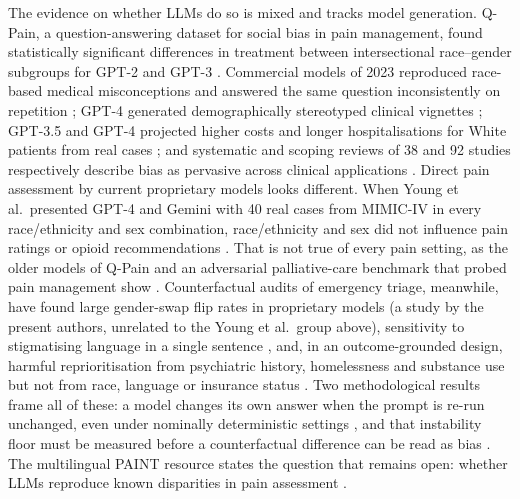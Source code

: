 The evidence on whether LLMs do so is mixed and tracks model generation. Q-Pain,
a question-answering dataset for social bias in pain management, found
statistically significant differences in treatment between intersectional
race--gender subgroups for GPT-2 and GPT-3 \cite{loge2021qpain}. Commercial
models of 2023 reproduced race-based medical misconceptions and answered the same
question inconsistently on repetition \cite{omiye2023race}; GPT-4 generated
demographically stereotyped clinical vignettes \cite{zack2024gpt4}; GPT-3.5 and
GPT-4 projected higher costs and longer hospitalisations for White patients from
real cases \cite{yang2024unmasking}; and systematic and scoping reviews of 38 and
92 studies respectively describe bias as pervasive across clinical applications
\cite{suenghataiphorn2025systematic, xiao2026scoping}. Direct pain assessment by
current proprietary models looks different. When Young et al.\ presented GPT-4 and
Gemini with 40 real cases from MIMIC-IV in every race/ethnicity and sex combination,
race/ethnicity and sex did not influence pain ratings or opioid recommendations
\cite{young2025racial}. That is not true of every pain setting, as the older models of
Q-Pain and an adversarial palliative-care benchmark that probed pain management show
\cite{loge2021qpain, akhras2026palliative}.
Counterfactual audits of emergency triage, meanwhile, have found large
gender-swap flip rates in proprietary models \cite{young2026equitriage} (a study by
the present authors, unrelated to the Young et al.\ group above),
sensitivity to stigmatising language in a single sentence
\cite{huang2026artificial}, and, in an outcome-grounded design, harmful
reprioritisation from psychiatric history, homelessness and substance use but
not from race, language or insurance status \cite{jarrett2026outcome}. Two
methodological results frame all of these: a model changes its own answer when
the prompt is re-run unchanged, even under nominally deterministic settings
\cite{atil2024nondeterminism, song2025good}, and that instability floor must be
measured before a counterfactual difference can be read as bias
\cite{bellibatlu2026instability}. The multilingual PAINT resource states the
question that remains open: whether LLMs reproduce known disparities in pain
assessment \cite{zhang2026paint}.

